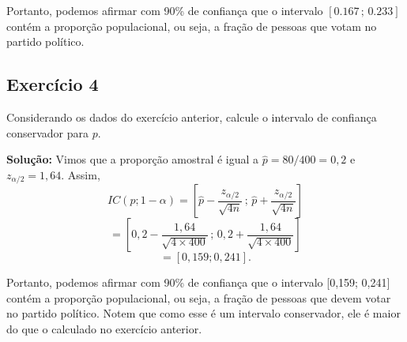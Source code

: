 \documentclass{article}
\begin{document}
Portanto, podemos afirmar com 90\% de confiança que o intervalo $[0.167 \, ; \, 0.233]$ contém a proporção populacional, ou seja, a fração de pessoas que votam no partido político.

\subsection{Exercício 4}
Considerando os dados do exercício anterior, calcule o intervalo de confiança conservador para $p$.

\vspace{0.5cm}
\textbf{Solução:}
Vimos que a proporção amostral é igual a $\hat{p} = 80/400 = 0,2$ e  
$z_{\alpha/2} = 1,64$. Assim,
    $$
    IC(p; 1-\alpha) = 
    \left[
    \hat{p} - \frac{z_{\alpha/2}}{\sqrt{4n}} \, ; \,
    \hat{p} + \frac{z_{\alpha/2}}{\sqrt{4n}}
    \right]
    $$
    $$
    = 
    \left[
    0,2 - \frac{1,64}{\sqrt{4 \times 400}} \, ; \,
    0,2 + \frac{1,64}{\sqrt{4 \times 400}}
    \right]
    $$
    $$
    = [0,159; 0,241].
    $$

Portanto, podemos afirmar com 90\% de confiança que o intervalo [0,159; 0,241] contém a proporção populacional, ou seja, a fração de pessoas que devem votar no partido político. Notem que como esse é um intervalo conservador, ele é maior do que o calculado no exercício anterior.
\end{document}
